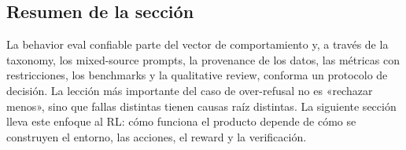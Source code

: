 
\subsection{Resumen de la sección}

La behavior eval confiable parte del vector de comportamiento y, a través de la taxonomy, los mixed-source prompts, la provenance de los datos, las métricas con restricciones, los benchmarks y la qualitative review, conforma un protocolo de decisión. La lección más importante del caso de over-refusal no es «rechazar menos», sino que fallas distintas tienen causas raíz distintas. La siguiente sección lleva este enfoque al RL: cómo funciona el producto depende de cómo se construyen el entorno, las acciones, el reward y la verificación.
